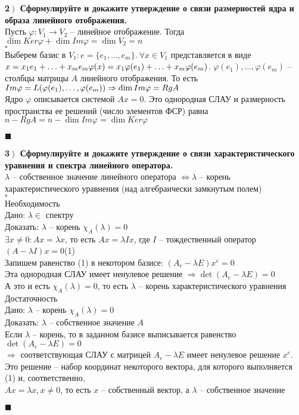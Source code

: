 \documentclass[a4paper,12pt]{article}
\begin{document}
    \textbf{2$\left.\right)$ Сформулируйте и докажите утверждение о связи размерностей ядра и образа линейного отображения.}\\Пусть $\varphi:V_1\rightarrow V_2$ -- линейное отображение. Тогда $\dim Ker\varphi+\dim Im\varphi=\dim V_2=n$\\
    $\square$\\
    Выберем базис в $V_1:e=\{e_1, \ldots, e_m \}.\ \forall x\in V_1$ представляется в виде $x=x_1e_1+\ldots+x_me_m\\
    \varphi(x)=x_1\varphi(e_1)+\ldots+x_m\varphi(e_m)$. $\varphi(e_1), \ldots, \varphi(e_m)$ -- столбцы матрицы $A$ линейного отображения. То есть $Im\varphi=L(\varphi(e_1), \ldots, \varphi(e_m))\\
    \Rightarrow\dim Im\varphi=Rg A$\\
    Ядро $\varphi$ описывается системой $Ax=0$. Это однородная СЛАУ и размерность пространства ее решений (число элементов ФСР) равна $n-RgA=n-\dim Im\varphi=\dim Ker\varphi$
    \begin{flushright}
        $\blacksquare$
    \end{flushright}
    \newpage

    \textbf{3$\left.\right)$ Сформулируйте и докажите утверждение о связи характеристического уравнения и спектра линейного оператора.}\\$\lambda$ -- собственное значение линейного оператора $\Leftrightarrow \lambda$ -- корень характеристического уравнения (над алгебраически замкнутым полем)\\
    $\square$\\
    Необходимость\\
    Дано: $\lambda\in$ спектру\\
    Доказать: $\lambda$ -- корень $\chi_A(\lambda)=0$\\
    $\exists x\ne 0: Ax=\lambda x$, то есть $Ax=\lambda Ix$, где $I$ -- тождественный оператор\\
    $(A-\lambda I)x=0$\qquad(1)\\
    Запишем равенство (1) в некотором базисе: $(A_e-\lambda E)x^e=0$\\
    Эта однородная СЛАУ имеет ненулевое решение $\Rightarrow\det(A_e-\lambda E)=0$\\
    А это и есть $\chi_A(\lambda)=0$, то есть $\lambda$ -- корень характеристического уравнения\\
    Достаточность\\
    Дано: $\lambda$ -- корень $\chi_A(\lambda)=0$\\
    Доказать: $\lambda$ -- собственное значение $A$\\
    Если $\lambda$ -- корень, то в заданном базисе выписывается равенство $\det(A_e-\lambda E)=0$\\
    $\Rightarrow$ соответствующая СЛАУ с матрицей $A_e-\lambda E$ имеет ненулевое решение $x^e$. Это решение -- набор координат некоторого вектора, для которого выполняется (1) и, соответственно, \\$Ax=\lambda x, x\ne 0$, то есть $x$ -- собственный вектор, а $\lambda$ -- собственное значение
    \begin{flushright}
        $\blacksquare$
    \end{flushright}
\end{document}
